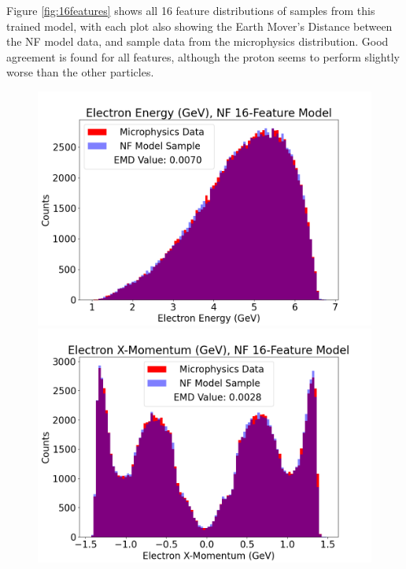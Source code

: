         Figure \ref{fig:16features} shows all 16 feature distributions of samples from this trained model, with each plot also showing the Earth Mover's Distance between the NF model data, and sample data from the microphysics distribution. Good agreement is found for all features, although the proton seems to perform slightly worse than the other particles. 

        \begin{figure}[H]
            \centering
            \begin{minipage}{.23\textwidth}
            
                \centering
                \includegraphics[width=.99\textwidth,trim={3cm 0 0 0},clip]{Chapters/Ch3-Simulations/normalizing_flows/pics/FinalPictures/Features16/Electron_Energy_,_NF_16-Feature_Model.png}
                \includegraphics[width=.99\textwidth,trim={3cm 0 0 0},clip]{Chapters/Ch3-Simulations/normalizing_flows/pics/FinalPictures/Features16/Electron_X-Momentum_,_NF_16-Feature_Model.png}

\end{minipage}
\end{figure}
